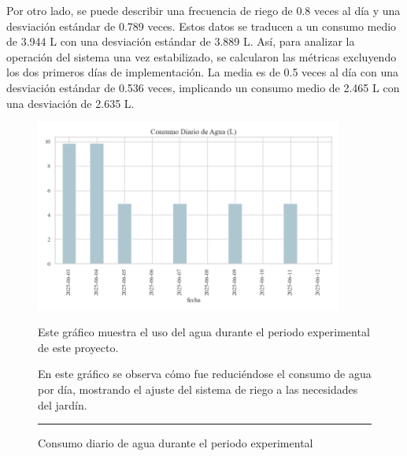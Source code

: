 \documentclass[pdflatex,sn-mathphys-num]{sn-jnl}%
\theoremstyle{thmstyleone}%
\theoremstyle{thmstyletwo}%
\theoremstyle{thmstylethree}%
\begin{document}
\begin{multicols}{2}
  Por otro lado, se puede describir una frecuencia de riego de 0.8 veces al día y una desviación estándar de 0.789 veces. Estos datos se traducen a un consumo medio de 3.944 L con una desviación estándar de 3.889 L. 
  Así, para analizar la operación del sistema una vez estabilizado, se calcularon las métricas excluyendo los dos primeros días de implementación. La media es de 0.5 veces al día con una desviación estándar de 0.536 veces, implicando un consumo medio de 2.465 L con una desviación de 2.635 L.
\end{multicols}


\begin{figure}[H]
    \centering
    \includegraphics[width=0.9\textwidth]{assets/consumo_diario.png}

    \caption{Consumo diario de agua durante el periodo experimental}
    \label{fig:consumo}

    \vspace{0.4cm}

    \noindent
    \begin{minipage}[t]{0.48\textwidth}
        \raggedright
        Este gráfico muestra el uso del agua durante el periodo experimental de este proyecto.
    \end{minipage}
    \hfill
    \begin{minipage}[t]{0.48\textwidth}
        \justifying
        En este gráfico se observa cómo fue reduciéndose el consumo de agua por día, mostrando el ajuste del sistema de riego a las necesidades del jardín.
    \end{minipage}

    \vspace{0.5cm}
    \hrule
\end{figure}
\end{document}
